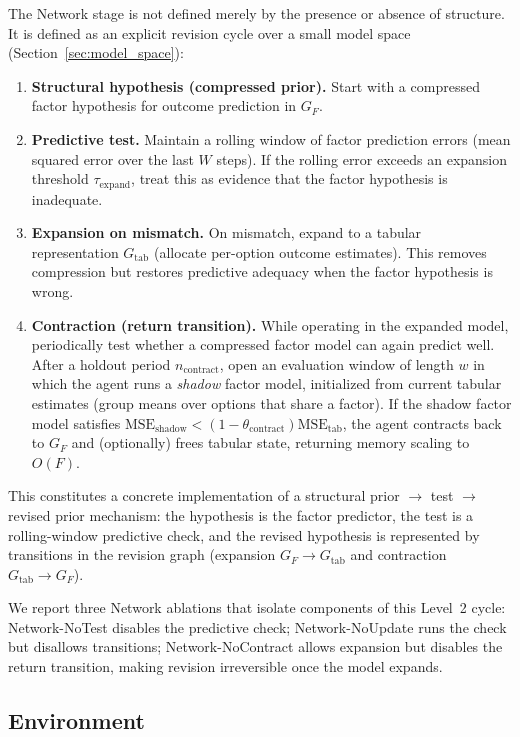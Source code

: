\documentclass[11pt]{article}
\begin{document}
The Network stage is not defined merely by the presence or absence of structure. It is defined as an explicit revision cycle over a small model space (Section~\ref{sec:model_space}):
\begin{enumerate}[leftmargin=*]
  \item \textbf{Structural hypothesis (compressed prior).} Start with a compressed factor hypothesis for outcome prediction in $G_F$.
  \item \textbf{Predictive test.} Maintain a rolling window of factor prediction errors (mean squared error over the last $W$ steps). If the rolling error exceeds an expansion threshold $\tau_{\mathrm{expand}}$, treat this as evidence that the factor hypothesis is inadequate.
  \item \textbf{Expansion on mismatch.} On mismatch, expand to a tabular representation $G_{\mathrm{tab}}$ (allocate per-option outcome estimates). This removes compression but restores predictive adequacy when the factor hypothesis is wrong.
  \item \textbf{Contraction (return transition).} While operating in the expanded model, periodically test whether a compressed factor model can again predict well. After a holdout period $n_{\mathrm{contract}}$, open an evaluation window of length $w$ in which the agent runs a \emph{shadow} factor model, initialized from current tabular estimates (group means over options that share a factor). If the shadow factor model satisfies
  $\mathrm{MSE}_{\mathrm{shadow}} < (1-\theta_{\mathrm{contract}})\mathrm{MSE}_{\mathrm{tab}}$,
  the agent contracts back to $G_F$ and (optionally) frees tabular state, returning memory scaling to $O(F)$.
\end{enumerate}

This constitutes a concrete implementation of a structural prior $\rightarrow$ test $\rightarrow$ revised prior mechanism: the hypothesis is the factor predictor, the test is a rolling-window predictive check, and the revised hypothesis is represented by transitions in the revision graph (expansion $G_F\!\rightarrow\!G_{\mathrm{tab}}$ and contraction $G_{\mathrm{tab}}\!\rightarrow\!G_F$).

We report three Network ablations that isolate components of this Level~2 cycle: Network-NoTest disables the predictive check; Network-NoUpdate runs the check but disallows transitions; Network-NoContract allows expansion but disables the return transition, making revision irreversible once the model expands.


\subsection{Environment}
\end{document}
